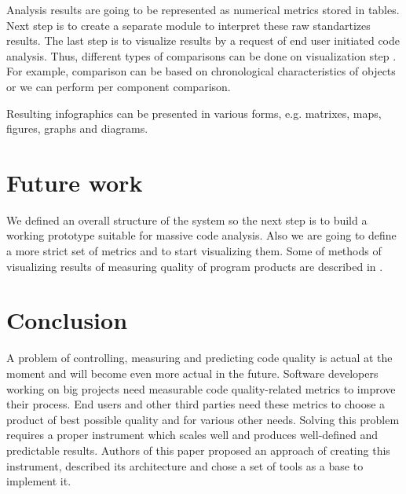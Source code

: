 \documentclass[runningheads,a4paper]{llncs}
\begin{document}
Analysis results are going to be represented as numerical metrics stored in
tables. Next step is to create a separate module to interpret these raw
standartizes results. The last step is to visualize results by a request of
end user initiated code analysis. Thus, different types of comparisons can be
done on visualization step \cite{item17}. For example, comparison can be based
on chronological characteristics of objects or we can perform per component comparison.

Resulting infographics can be presented in various forms, e.g. matrixes, maps,
figures, graphs and diagrams.

\section{Future work}

We defined an overall structure of the system so the next step is
to build a working prototype suitable for massive code analysis. Also
we are going to define a more strict set of metrics and to start
visualizing them. Some of methods of visualizing results of measuring
quality of program products are described in \cite{item18,item19,item20}.

\section{Conclusion}

A problem of controlling, measuring and predicting code quality is actual
at the moment and will become even more actual in the future. Software
developers working on big projects need measurable code quality-related
metrics to improve their process. End users and other third parties need
these metrics to choose a product of best possible quality and for various
other needs. Solving this problem requires a proper instrument which scales
well and produces well-defined and predictable results. Authors of this paper
proposed an approach of creating this instrument, described its architecture
and chose a set of tools as a base to implement it.
\end{document}
